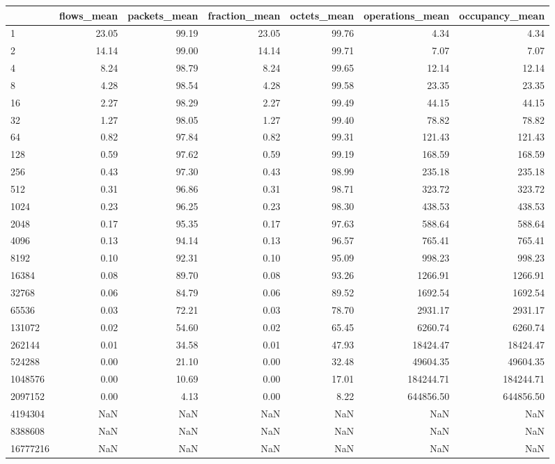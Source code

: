 \begin{tabular}{lrrrrrr}
\toprule
 & flows_mean & packets_mean & fraction_mean & octets_mean & operations_mean & occupancy_mean \\
\midrule
1 & 23.05 & 99.19 & 23.05 & 99.76 & 4.34 & 4.34 \\
2 & 14.14 & 99.00 & 14.14 & 99.71 & 7.07 & 7.07 \\
4 & 8.24 & 98.79 & 8.24 & 99.65 & 12.14 & 12.14 \\
8 & 4.28 & 98.54 & 4.28 & 99.58 & 23.35 & 23.35 \\
16 & 2.27 & 98.29 & 2.27 & 99.49 & 44.15 & 44.15 \\
32 & 1.27 & 98.05 & 1.27 & 99.40 & 78.82 & 78.82 \\
64 & 0.82 & 97.84 & 0.82 & 99.31 & 121.43 & 121.43 \\
128 & 0.59 & 97.62 & 0.59 & 99.19 & 168.59 & 168.59 \\
256 & 0.43 & 97.30 & 0.43 & 98.99 & 235.18 & 235.18 \\
512 & 0.31 & 96.86 & 0.31 & 98.71 & 323.72 & 323.72 \\
1024 & 0.23 & 96.25 & 0.23 & 98.30 & 438.53 & 438.53 \\
2048 & 0.17 & 95.35 & 0.17 & 97.63 & 588.64 & 588.64 \\
4096 & 0.13 & 94.14 & 0.13 & 96.57 & 765.41 & 765.41 \\
8192 & 0.10 & 92.31 & 0.10 & 95.09 & 998.23 & 998.23 \\
16384 & 0.08 & 89.70 & 0.08 & 93.26 & 1266.91 & 1266.91 \\
32768 & 0.06 & 84.79 & 0.06 & 89.52 & 1692.54 & 1692.54 \\
65536 & 0.03 & 72.21 & 0.03 & 78.70 & 2931.17 & 2931.17 \\
131072 & 0.02 & 54.60 & 0.02 & 65.45 & 6260.74 & 6260.74 \\
262144 & 0.01 & 34.58 & 0.01 & 47.93 & 18424.47 & 18424.47 \\
524288 & 0.00 & 21.10 & 0.00 & 32.48 & 49604.35 & 49604.35 \\
1048576 & 0.00 & 10.69 & 0.00 & 17.01 & 184244.71 & 184244.71 \\
2097152 & 0.00 & 4.13 & 0.00 & 8.22 & 644856.50 & 644856.50 \\
4194304 & NaN & NaN & NaN & NaN & NaN & NaN \\
8388608 & NaN & NaN & NaN & NaN & NaN & NaN \\
16777216 & NaN & NaN & NaN & NaN & NaN & NaN \\
\bottomrule
\end{tabular}
